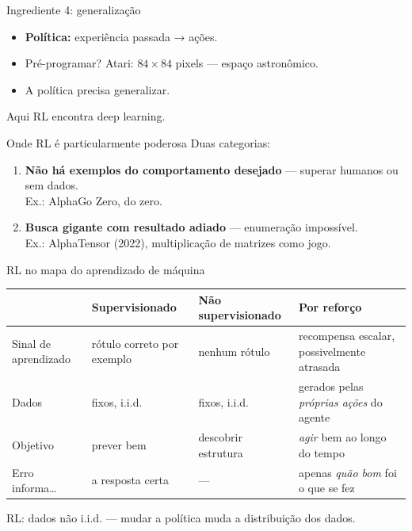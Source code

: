 \documentclass[aspectratio=169, 11pt]{beamer}
\begin{document}
\begin{frame}{Ingrediente 4: generalização}
  \begin{itemize}
    \item \textbf{Política:} experiência passada → ações.
    \item Pré-programar? Atari: $84\times 84$ pixels — espaço astronômico.
    \item A política precisa \alert{generalizar}.
  \end{itemize}

  \medskip
  {\small\color{rlCinza} Aqui RL encontra deep learning.}
\end{frame}

\begin{frame}{Onde RL é particularmente poderosa}
  Duas categorias:
  \begin{enumerate}
    \item \textbf{Não há exemplos do comportamento desejado} — superar humanos ou sem dados.
          \\ {\small\color{rlCinza} Ex.: AlphaGo Zero, do zero.}
    \item \textbf{Busca gigante com resultado adiado} — enumeração impossível.
          \\ {\small\color{rlCinza} Ex.: AlphaTensor (2022), multiplicação de matrizes como jogo.}
  \end{enumerate}
\end{frame}

\begin{frame}{RL no mapa do aprendizado de máquina}
  \begin{center}
  \footnotesize
  \begin{tabular}{@{}p{2.6cm}p{3.4cm}p{3.4cm}p{3.8cm}@{}}
    \toprule
      & \textbf{Supervisionado} & \textbf{Não supervisionado} & \textbf{Por reforço} \\
    \midrule
    Sinal de aprendizado & rótulo correto por exemplo & nenhum rótulo &
      recompensa escalar, possivelmente atrasada \\
    Dados & fixos, i.i.d. & fixos, i.i.d. &
      gerados pelas \emph{próprias ações} do agente \\
    Objetivo & prever bem & descobrir estrutura &
      \emph{agir} bem ao longo do tempo \\
    Erro informa\ldots & a resposta certa & — &
      apenas \emph{quão bom} foi o que se fez \\
    \bottomrule
  \end{tabular}
  \end{center}

  \begin{alertabox}
    RL: dados não i.i.d. — mudar a política muda a distribuição dos dados.
  \end{alertabox}
\end{frame}
\end{document}
